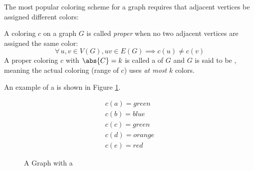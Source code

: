The most popular coloring scheme for a graph requires that adjacent vertices be assigned different colors:

\begin{definition}
  A coloring \(c\) on a graph \(G\) is called \emph{proper} when no two adjacent vertices are assigned the same color:
  \[\forall\,u,v\in V(G),uv\in E(G)\implies c(u)\ne c(v)\]
  A proper coloring \(c\) with \(\abs{C}=k\) is called a \emph{} of \(G\) and \(G\) is said to be
  \emph{}, meaning the actual coloring (range of \(c\)) uses \emph{at most} \(k\) colors.
\end{definition}

An example of a  is shown in Figure \ref{fig:exproper}.

\begin{figure}[h]
  \label{fig:exproper}
  \begin{minipage}[t]{3in}
    \begin{center}
      \vspace{0in}
    \end{center}
  \end{minipage}
  \begin{minipage}[t]{3in}
    \begin{gather*}
      c(a)=green \\
      c(b)=blue \\
      c(c)=green \\
      c(d)=orange \\
      c(e)=red
    \end{gather*}
  \end{minipage}
  \caption{A Graph with a }
\end{figure}

